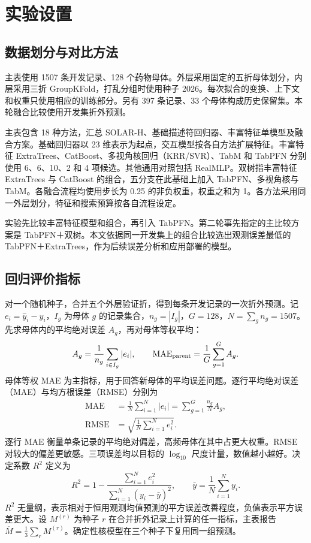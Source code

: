\section{实验设置}
\subsection{数据划分与对比方法}
主表使用 1507 条开发记录、128 个药物母体。外层采用固定的五折母体划分，内层采用三折 GroupKFold，打乱分组时使用种子 2026。每次拟合的变换、上下文和权重只使用相应的训练部分。另有 397 条记录、33 个母体构成历史保留集。本轮融合比较使用开发集折外预测。

主表包含 18 种方法，汇总 SOLAR-H、基础描述符回归器、丰富特征单模型及融合方案。基础回归器以 23 维表示为起点，交互模型按各自方法扩展特征。丰富特征 ExtraTrees、CatBoost\cite{catboost2018}、多视角核回归（KRR/SVR）\cite{smola2004}、TabM\cite{tabm2025} 和 TabPFN 分别使用 6、6、10、2 和 4 项候选。其他通用对照包括 RealMLP\cite{realmlp2024}。双树指丰富特征 ExtraTrees 与 CatBoost 的组合，五分支在此基础上加入 TabPFN、多视角核与 TabM。各融合流程均使用步长为 0.25 的非负权重，权重之和为 1。各方法采用同一外层划分，特征和搜索预算按各自流程设定。

实验先比较丰富特征模型和组合，再引入 TabPFN。第二轮事先指定的主比较方案是 TabPFN＋双树。本文依据同一开发集上的组合比较选出观测误差最低的 TabPFN＋ExtraTrees，作为后续误差分析和应用部署的模型。

\subsection{回归评价指标}
对一个随机种子，合并五个外层验证折，得到每条开发记录的一次折外预测。记 $e_i=\hat y_i-y_i$，$I_g$ 为母体 $g$ 的记录集合，$n_g=|I_g|$，$G=128$，$N=\sum_g n_g=1507$。先求母体内的平均绝对误差 $A_g$，再对母体等权平均：
\begin{equation}\label{eq:parentmae}
A_g=\frac{1}{n_g}\sum_{i\in I_g}|e_i|,\qquad
\mathrm{MAE}_{\rm parent}=\frac{1}{G}\sum_{g=1}^{G} A_g .
\end{equation}
母体等权 MAE 为主指标，用于回答新母体的平均误差问题。逐行平均绝对误差（MAE）与均方根误差（RMSE）分别为
\begin{align}
\mathrm{MAE}&=\frac{1}{N}\sum_{i=1}^{N}|e_i|
=\sum_{g=1}^{G}\frac{n_g}{N}A_g,\\
\mathrm{RMSE}&=\sqrt{\frac{1}{N}\sum_{i=1}^{N}e_i^2}.
\end{align}
逐行 MAE 衡量单条记录的平均绝对偏差，高频母体在其中占更大权重。RMSE 对较大的偏差更敏感。三项误差均以目标的 $\log_{10}$ 尺度计量，数值越小越好。决定系数 $R^2$ 定义为
\begin{equation}
R^2=1-\frac{\sum_{i=1}^{N} e_i^2}{\sum_{i=1}^{N}(y_i-\bar y)^2},
\qquad \bar y=\frac1N\sum_{i=1}^{N}y_i.
\end{equation}
$R^2$ 无量纲，表示相对于恒用观测均值预测的平方误差改善程度，负值表示平方误差更大。设 $M^{(r)}$ 为种子 $r$ 在合并折外记录上计算的任一指标，主表报告 $\overline M=\tfrac13\sum_{r} M^{(r)}$。确定性核模型在三个种子下复用同一组预测。

